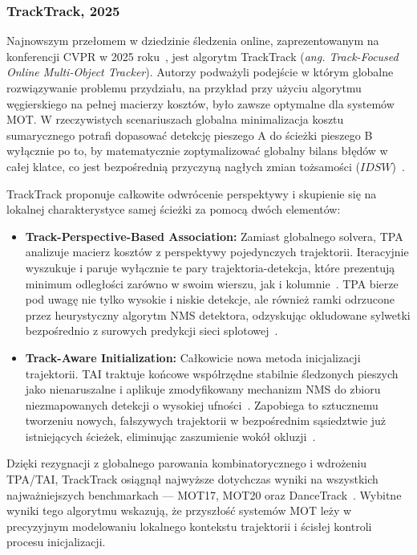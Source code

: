\subsubsection{TrackTrack, 2025}

Najnowszym przełomem w dziedzinie śledzenia online, zaprezentowanym na konferencji CVPR w 2025
roku~\cite{shim2025tracktrack}, jest algorytm TrackTrack (\textit{ang. Track-Focused Online
  Multi-Object Tracker}). Autorzy podważyli podejście w którym globalne rozwiązywanie problemu
przydziału, na przykład przy użyciu algorytmu węgierskiego na pełnej macierzy kosztów, było zawsze
optymalne dla systemów MOT. W rzeczywistych scenariuszach globalna minimalizacja kosztu
sumarycznego potrafi dopasować detekcję pieszego A do ścieżki pieszego B wyłącznie po to, by
matematycznie zoptymalizować globalny bilans błędów w całej klatce, co jest bezpośrednią przyczyną
nagłych zmian tożsamości ($IDSW$)~\cite{shim2025tracktrack}.

TrackTrack proponuje całkowite odwrócenie perspektywy i skupienie się na lokalnej charakterystyce
samej ścieżki za pomocą dwóch elementów\cite{shim2025tracktrack}:
\begin{itemize}
  \item \textbf{Track-Perspective-Based Association:} Zamiast globalnego solvera, TPA analizuje macierz kosztów z perspektywy pojedynczych trajektorii. Iteracyjnie wyszukuje i paruje wyłącznie te pary trajektoria-detekcja, które prezentują minimum odległości zarówno w swoim wierszu, jak i kolumnie~\cite{shim2025tracktrack}. TPA bierze pod uwagę nie tylko wysokie i niskie detekcje, ale również ramki odrzucone przez heurystyczny algorytm NMS detektora, odzyskując okludowane sylwetki bezpośrednio z surowych predykcji sieci splotowej~\cite{shim2025tracktrack}.
  \item \textbf{Track-Aware Initialization:} Całkowicie nowa metoda inicjalizacji trajektorii. TAI traktuje końcowe współrzędne stabilnie śledzonych pieszych jako nienaruszalne i aplikuje zmodyfikowany mechanizm NMS do zbioru niezmapowanych detekcji o wysokiej ufności~\cite{shim2025tracktrack}. Zapobiega to sztucznemu tworzeniu nowych, fałszywych trajektorii w bezpośrednim sąsiedztwie już istniejących ścieżek, eliminując zaszumienie wokół okluzji~\cite{shim2025tracktrack}.
\end{itemize}

Dzięki rezygnacji z globalnego parowania kombinatorycznego i wdrożeniu TPA/TAI, TrackTrack osiągnął
najwyższe dotychczas wyniki na wszystkich najważniejszych benchmarkach --- MOT17, MOT20 oraz
DanceTrack~\cite{shim2025tracktrack}. Wybitne wyniki tego algorytmu wskazują, że przyszłość
systemów MOT leży w precyzyjnym modelowaniu lokalnego kontekstu trajektorii i ścisłej kontroli
procesu inicjalizacji.


